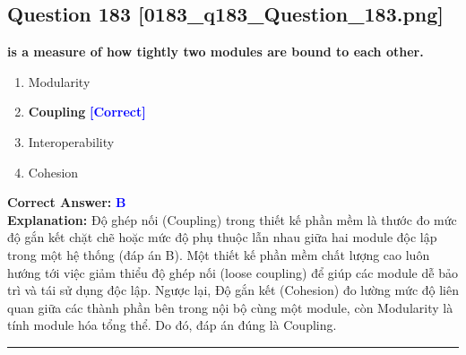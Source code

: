\documentclass[11pt,a4paper]{article}
\begin{document}
\begin{minipage}{\textwidth}
\subsection*{Question 183 \quad \footnotesize{[0183\_q183\_Question\_183.png]}}
\noindent \textbf{is a measure of how tightly two modules are bound to each other.}

\begin{enumerate}[label=\Alph*.]
    \item Modularity
    \item \textbf{Coupling} \hfill \textcolor{blue}{\textbf{[Correct]}}
    \item Interoperability
    \item Cohesion
\end{enumerate}

\noindent \textbf{Correct Answer:} \textcolor{blue}{\textbf{B}} \\[2pt]
\noindent \textbf{Explanation:} Độ ghép nối (Coupling) trong thiết kế phần mềm là thước đo mức độ gắn kết chặt chẽ hoặc mức độ phụ thuộc lẫn nhau giữa hai module độc lập trong một hệ thống (đáp án B). Một thiết kế phần mềm chất lượng cao luôn hướng tới việc giảm thiểu độ ghép nối (loose coupling) để giúp các module dễ bảo trì và tái sử dụng độc lập. Ngược lại, Độ gắn kết (Cohesion) đo lường mức độ liên quan giữa các thành phần bên trong nội bộ cùng một module, còn Modularity là tính module hóa tổng thể. Do đó, đáp án đúng là Coupling.

\par\vspace{0.3cm}
\hrule
\vspace{0.3cm}
\end{minipage}
\end{document}

